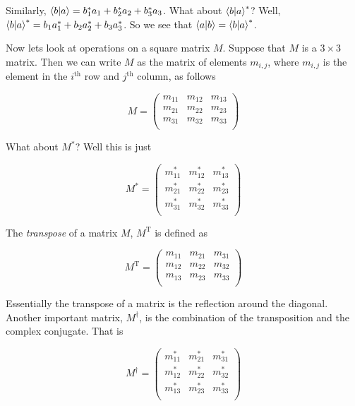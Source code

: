 \documentclass[11pt, oneside]{article}   	%
\begin{document}
\bigskip
\noindent
Similarly, $\braket{b | a} = b^*_1 a_1 + b^*_2a_2 + b^*_3 a_3$. What about $\braket{b | a}^*$? Well,
$\braket{b | a}^* = b_1 a_1^* + b_2 a_2^* + b_3 a^*_3$. So we see that $\braket{a | b} = \braket{b | a}^*$.


\bigskip
\noindent
Now lets look at operations on a square matrix $M$. Suppose that $M$ is a $3 \times 3$ matrix. Then we can write $M$ 
as the matrix of elements $m_{i,j}$, where $m_{i,j}$  is the element in the $i^\text{th}$ row and
$j^{\text{th}}$ column, as follows

\begin{equation*}
M =
\begin{pmatrix}
m_{11} & m_{12} & m_{13} \\
m_{21} & m_{22} & m_{23} \\
m_{31} & m_{32} & m_{33} \\
\end{pmatrix}
\end{equation*}

\bigskip
\noindent
What about $M^*$? Well this is just

\begin{equation*}
M^* =
\begin{pmatrix}
m_{11}^* & m_{12}^* & m_{13}^* \\
m_{21}^* & m_{22}^* & m_{23}^* \\
m_{31}^* & m_{32}^* & m_{33}^* \\
\end{pmatrix}
\end{equation*}

\bigskip
\noindent
The \emph{transpose} of a matrix $M$, $M^\text{T}$ is defined as

\begin{equation*}
M^\text{T} =
\begin{pmatrix}
m_{11} & m_{21} & m_{31} \\
m_{12} & m_{22} & m_{32} \\
m_{13} & m_{23} & m_{33} \\
\end{pmatrix}
\end{equation*}

\bigskip
\noindent
Essentially the transpose of a matrix is the reflection around the diagonal. Another important matrix, $M^\dagger$, is the combination of the transposition and
the complex conjugate. That is

\begin{equation*}
M^\dagger =
\begin{pmatrix}
m_{11}^* & m_{21}^* & m_{31}^* \\
m_{12}^* & m_{22}^* & m_{32}^* \\
m_{13}^* & m_{23}^* & m_{33}^* \\
\end{pmatrix}
\end{equation*}
\end{document}
